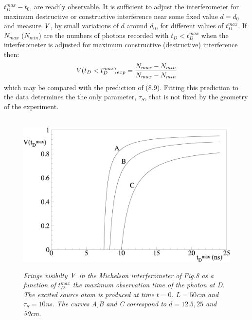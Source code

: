 \documentclass [12pt]{article}
\begin{document}
{ $t_D^{max}-t_0$, are readily observable. It is sufficient to adjust the interferometer for maximum
 destructive or constructive interference near some fixed value $d = d_0$ and measure ${\it V}$, by
   small variations of $d$ around $d_0$, for different values of $t_D^{max}$.
   If $N_{max}$ ($N_{min}$) are the numbers of photons recorded with
   $t_D<t_D^{max}$  when the interferometer is adjusted for maximum constructive (destructive) 
   interference then:
    \begin{equation}
     {\it V}(t_D < t_D^{max})_{exp} = \frac{N_{max}-N_{min}}{N_{max}-N_{min}}
    \end{equation}
     which may be compared with the prediction of (8.9). Fitting this prediction to the 
    data determines the the only parameter, $\tau_S$, that is not fixed by the geometry of the
    experiment.\

\begin{figure}[htbp]
\begin{center}
\hspace*{-0.5cm}\mbox{
\includegraphics[width=5.5in]{poptf9c.eps}}
\caption{{\sl Fringe visibilty  ${\it V}$ in the Michelson interferometer of Fig.8 as a function
  of $t_D^{max}$ the maximum observation time of the photon at D. The excited source atom 
  is produced at time $t=0$. $L= 50$cm and $\tau_S = 10$ns. The curves A,B and C correspond to $d= 12.5, 25$ and 50cm.
  }} 
\label{fig-fig9}
\end{center}
\end{figure}

}
\end{document}
